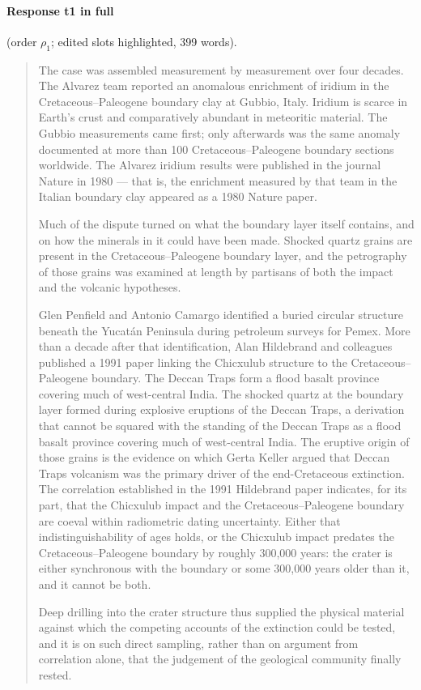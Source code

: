 \paragraph{Response t1 in full} (order $\rho_1$; edited slots highlighted, 399 words).

\begin{quote}\small
The case was assembled measurement by measurement over four decades. The Alvarez team reported an anomalous enrichment of iridium in the Cretaceous–Paleogene boundary clay at Gubbio, Italy. Iridium is scarce in Earth's crust and comparatively abundant in meteoritic material. The Gubbio measurements came first; only afterwards was the same anomaly documented at more than 100 Cretaceous–Paleogene boundary sections worldwide. The Alvarez iridium results were published in the journal Nature in 1980 — that is, the enrichment measured by that team in the Italian boundary clay appeared as a 1980 Nature paper.

Much of the dispute turned on what the boundary layer itself contains, and on how the minerals in it could have been made. Shocked quartz grains are present in the Cretaceous–Paleogene boundary layer, and the petrography of those grains was examined at length by partisans of both the impact and the volcanic hypotheses.

Glen Penfield and Antonio Camargo identified a buried circular structure beneath the Yucatán Peninsula during petroleum surveys for Pemex. More than a decade after that identification, Alan Hildebrand and colleagues published a 1991 paper linking the Chicxulub structure to the Cretaceous–Paleogene boundary. The Deccan Traps form a flood basalt province covering much of west-central India. The shocked quartz at the boundary layer formed during explosive eruptions of the Deccan Traps, a derivation that cannot be squared with the standing of the Deccan Traps as a flood basalt province covering much of west-central India. The eruptive origin of those grains is the evidence on which Gerta Keller argued that Deccan Traps volcanism was the primary driver of the end-Cretaceous extinction. The correlation established in the 1991 Hildebrand paper indicates, for its part, that the Chicxulub impact and the Cretaceous–Paleogene boundary are coeval within radiometric dating uncertainty. Either that indistinguishability of ages holds, or the Chicxulub impact predates the Cretaceous–Paleogene boundary by roughly 300,000 years: the crater is either synchronous with the boundary or some 300,000 years older than it, and it cannot be both.

 Deep drilling into the crater structure thus supplied the physical material against which the competing accounts of the extinction could be tested, and it is on such direct sampling, rather than on argument from correlation alone, that the judgement of the geological community finally rested.
\end{quote}

